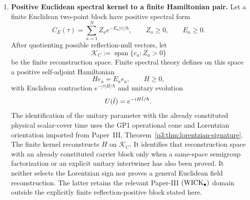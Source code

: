 \documentclass[12pt,a4paper]{article}
\begin{document}
\begin{theorem}
\begin{enumerate}[label=(\roman*), leftmargin=2.3em]
\item \textbf{Positive Euclidean spectral kernel to a finite Hamiltonian pair.}
Let a finite Euclidean two-point block have positive spectral form
\begin{equation}
\label{p4:eq:three-map-positive-euclidean-kernel}
C_E(\tau)=\sum_{a=1}^N Z_a e^{-E_a|\tau|/\hbar},
\qquad
Z_a\ge0,\qquad E_a\ge0 .
\end{equation}
After quotienting possible reflection-null vectors, let
\[
\mathcal K_C:=\operatorname{span}\{e_a:Z_a>0\}
\]
be the finite reconstruction space.  Finite spectral theory defines on this
space a positive self-adjoint Hamiltonian
\begin{equation}
\label{p4:eq:three-map-hamiltonian}
H e_a=E_a e_a,\qquad H\ge0,
\end{equation}
with Euclidean contraction \(e^{-|\tau|H/\hbar}\) and unitary evolution
\begin{equation}
\label{p4:eq:three-map-real-time}
U(\tilde t)=e^{-iH\tilde t/\hbar}.
\end{equation}
The identification of the unitary parameter with the already constituted
physical scalar-cover time uses the GP1 operational cone and Lorentzian
orientation imported from Paper~III,
Theorem~\ref{p3:thm:lorentzian-signature}.  The finite kernel reconstructs
\(H\) on \(\mathcal K_C\).  It identifies that reconstruction space with an
already constituted carrier block only when a same-space semigroup
factorization or an explicit unitary intertwiner has also been proved.  It
neither selects the Lorentzian sign nor proves a general Euclidean field
reconstruction.  The latter retains the relevant Paper-III \(({\rm WICK}_\bullet)\) domain
outside the explicitly finite reflection-positive block stated here.
\end{enumerate}
\end{theorem}
\end{document}
